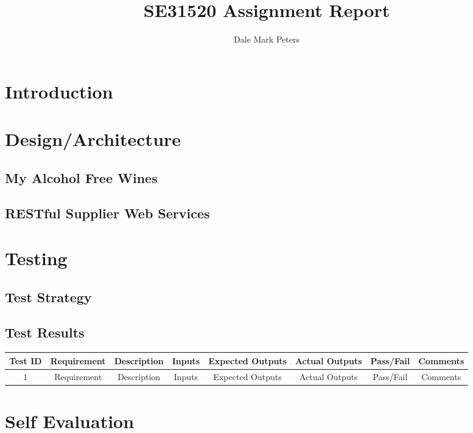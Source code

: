 \documentclass[a4paper,12pt,hidelinks]{report}
\title{SE31520 Assignment Report}
\author{Dale Mark Peters}
\begin{document}
\maketitle

\renewcommand{\abstractname}{Acknowledgements}
\begin{abstract}
\end{abstract}
\restoregeometry

\tableofcontents\newpage
\chapter{Introduction}
    \blindtext
\chapter{Design/Architecture}
    \section{My Alcohol Free Wines}
    \blindtext
    \section{RESTful Supplier Web Services}
    \blindtext
\chapter{Testing}
    \section{Test Strategy}

    \newpage
    \begin{landscape}
        \section{Test Results}
        \begin{center}
            \begin{tabular}{ |c|c|c|c|c|c|c|c| } 
                \hline
                \textbf{Test ID} & R\textbf{equirement} & D\textbf{escription} & I\textbf{nputs} & E\textbf{xpected Outputs} & A\textbf{ctual Outputs} & P\textbf{ass/Fail} & \textbf{Comments}
                \\\hline\hline
                1 & Requirement & Description & Inputs & Expected Outputs & Actual Outputs & Pass/Fail & Comments\\ 
                \hline
            \end{tabular}
        \end{center}
    \end{landscape}

    \blindtext
\chapter{Self Evaluation}
    \blindtext

\printbibliography
\end{document}
